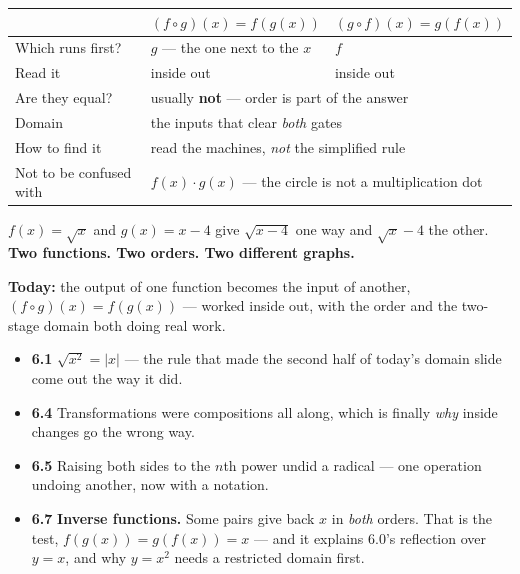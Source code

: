 \documentclass[aspectratio=169, 11pt]{beamer}
\begin{document}
\begin{frame}[t, plain]
  \begin{center}
  \footnotesize
  \renewcommand{\arraystretch}{1.35}
  \begin{tabular}{lll}
  \hline
   & \textbf{$(f\circ g)(x)=f(g(x))$} & \textbf{$(g\circ f)(x)=g(f(x))$} \\
  \hline
  Which runs first? & $g$ --- the one next to the $x$ & $f$ \\
  Read it & inside out & inside out \\
  Are they equal? & \multicolumn{2}{l}{usually \textbf{not} --- order is part of the answer} \\
  Domain & \multicolumn{2}{l}{the inputs that clear \emph{both} gates} \\
  How to find it & \multicolumn{2}{l}{read the machines, \emph{not} the simplified rule} \\
  Not to be confused with & \multicolumn{2}{l}{$f(x)\cdot g(x)$ --- the circle is not a
  multiplication dot} \\
  \hline
  \end{tabular}
  \end{center}
  \vspace{8pt}
  \begin{center}
    $f(x)=\sqrt{x}$ and $g(x)=x-4$ give $\sqrt{x-4}$ one way and $\sqrt{x}-4$ the other. \\[3pt]
    \textbf{Two functions. Two orders. Two different graphs.}
  \end{center}
\end{frame}

\begin{frame}[t, plain]
  \textbf{Today:} the output of one function becomes the input of another, $(f\circ g)(x)=f(g(x))$
  --- worked inside out, with the order and the two-stage domain both doing real work.\\[8pt]
  \begin{itemize}\setlength{\itemsep}{3pt}
    \item \textbf{6.1} $\sqrt{x^{2}}=|x|$ --- the rule that made the second half of today's domain
          slide come out the way it did.
    \item \textbf{6.4} Transformations were compositions all along, which is finally \emph{why}
          inside changes go the wrong way.
    \item \textbf{6.5} Raising both sides to the $n$th power undid a radical --- one operation
          undoing another, now with a notation.
    \item \textbf{6.7} \textbf{Inverse functions.} Some pairs give back $x$ in \emph{both} orders.
          That is the test, $f(g(x))=g(f(x))=x$ --- and it explains 6.0's reflection over $y=x$, and
          why $y=x^{2}$ needs a restricted domain first.
  \end{itemize}
\end{frame}
\end{document}
